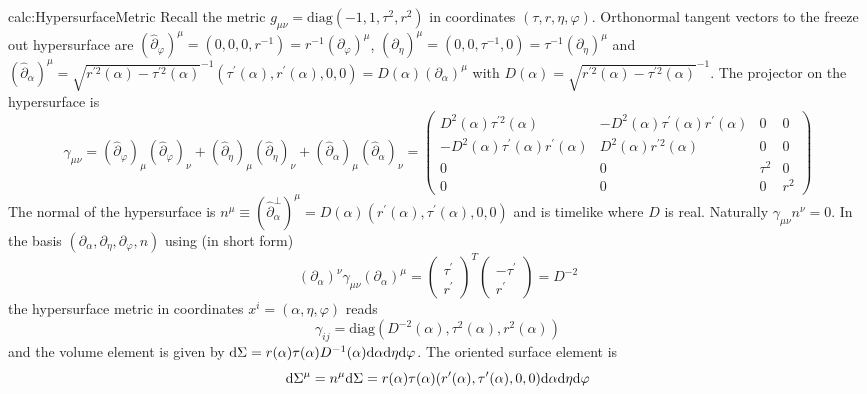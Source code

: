 \begin{calc}{calc:HypersurfaceMetric}
    Recall the metric $g_{\mu\nu}=\text{diag}(-1,1,\tau^2,r^2)$ in coordinates $(\tau,r,\eta,\varphi)$. Orthonormal tangent vectors to the freeze out hypersurface are $(\hat\partial_\varphi)^\mu=(0,0,0,r^{-1})=r^{-1}(\partial_\varphi)^\mu$, $(\hat\partial_\eta)^\mu=(0,0,\tau^{-1},0)=\tau^{-1}(\partial_\eta)^\mu$ and $(\hat\partial_\alpha)^\mu=\sqrt{r^{\prime 2}(\alpha)-\tau^{\prime 2}(\alpha)}^{-1}(\tau^{\prime}(\alpha),r^{\prime}(\alpha),0,0)=D(\alpha)(\partial_\alpha)^\mu$ with $D(\alpha)=\sqrt{r^{\prime 2}(\alpha)-\tau^{\prime 2}(\alpha)}^{-1}$. The projector on the hypersurface is
    \begin{equation}
        \gamma_{\mu\nu}=(\hat\partial_\varphi)_\mu(\hat\partial_\varphi)_\nu+(\hat\partial_\eta)_\mu(\hat\partial_\eta)_\nu+(\hat\partial_\alpha)_\mu(\hat\partial_\alpha)_\nu=\begin{pmatrix}
            D^2(\alpha)\tau^{\prime2}(\alpha)               & -D^2(\alpha)\tau^\prime(\alpha)r^\prime(\alpha) & 0      & 0   \\
            -D^2(\alpha)\tau^\prime(\alpha)r^\prime(\alpha) & D^2(\alpha)r^{\prime2}(\alpha)                  & 0      & 0   \\
            0                                               & 0                                               & \tau^2 & 0   \\
            0                                               & 0                                               & 0      & r^2
        \end{pmatrix}
    \end{equation}
    The normal of the hypersurface is $n^\mu\equiv(\hat\partial_\alpha^\perp)^\mu=D(\alpha)(r^\prime(\alpha),\tau^\prime(\alpha),0,0)$ and is timelike where $D$ is real. Naturally $\gamma_{\mu\nu}n^\nu=0$. In the basis $(\partial_\alpha,\partial_\eta,\partial_\varphi,n)$ using (in short form)
    \begin{equation}
        (\partial_\alpha)^\nu\gamma_{\mu\nu}(\partial_\alpha)^\mu=\begin{pmatrix}
            \tau^\prime \\r^\prime
        \end{pmatrix}^T\begin{pmatrix}
            -\tau^\prime \\
            r^\prime
        \end{pmatrix}=D^{-2}
    \end{equation}
    the hypersurface metric in coordinates $x^i=(\alpha,\eta,\varphi)$ reads
    \begin{equation}
        \gamma_{ij}=\text{diag}(D^{-2}(\alpha),\tau^2(\alpha),r^2(\alpha))
    \end{equation}
    and the volume element is given by $\text{d}\Sigma=r(\alpha)\tau(\alpha) D^{-1}(\alpha)\text{d}\alpha\text{d}\eta\text{d}\varphi$. The oriented surface element is \begin{equation}
        \text{d}\Sigma^\mu=n^\mu\text{d}\Sigma=r(\alpha)\tau(\alpha)(r^\prime(\alpha),\tau^\prime(\alpha),0,0)\text{d}\alpha\text{d}\eta\text{d}\varphi
    \end{equation}
\end{calc}

